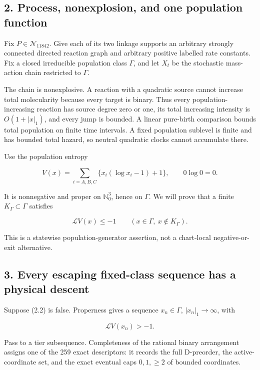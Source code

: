\subsection{2. Process, nonexplosion, and one population
function}

Fix \(P\in\mathcal N_{11842}\). Give each of its two linkage supports an
arbitrary strongly connected directed reaction graph and arbitrary
positive labelled rate constants. Fix a closed irreducible population
class \(\Gamma\), and let \(X_t\) be the stochastic mass-action chain
restricted to \(\Gamma\).

The chain is nonexplosive. A reaction with a quadratic source cannot
increase total molecularity because every target is binary. Thus every
population-increasing reaction has source degree zero or one, its total
increasing intensity is \(O(1+|x|_1)\), and every jump is bounded. A
linear pure-birth comparison bounds total population on finite time
intervals. A fixed population sublevel is finite and has bounded total
hazard, so neutral quadratic clocks cannot accumulate there.

Use the population entropy

\[
 V(x)=\sum_{i=A,B,C}\{x_i(\log x_i-1)+1\},
 \qquad 0\log0=0.                                    \tag{2.1}
\]

It is nonnegative and proper on \(\mathbb N_0^3\), hence on \(\Gamma\).
We will prove that a finite \(K_\Gamma\subset\Gamma\) satisfies

\[
                    \mathcal LV(x)\le-1
       \qquad(x\in\Gamma,\ x\notin K_\Gamma).        \tag{2.2}
\]

This is a statewise population-generator assertion, not a chart-local
negative-or-exit alternative.

\subsection{3. Every escaping fixed-class sequence has a physical
descent}

Suppose (2.2) is false. Properness gives a sequence \(x_n\in\Gamma\),
\(|x_n|_1\to\infty\), with

\[
                          \mathcal LV(x_n)>-1.         \tag{3.1}
\]

Pass to a tier subsequence. Completeness of the rational binary
arrangement assigns one of the 259 exact descriptors: it records the
full D-preorder, the active-coordinate set, and the exact eventual caps
\(0,1,\ge2\) of bounded coordinates.

